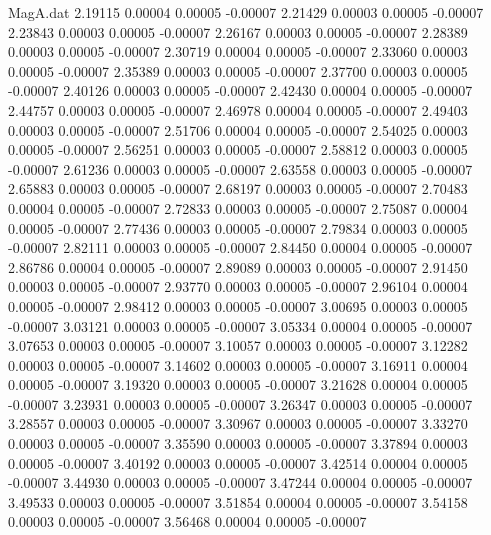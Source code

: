 \begin{filecontents}{MagA.dat}
   2.19115    0.00004    0.00005   -0.00007
   2.21429    0.00003    0.00005   -0.00007
   2.23843    0.00003    0.00005   -0.00007
   2.26167    0.00003    0.00005   -0.00007
   2.28389    0.00003    0.00005   -0.00007
   2.30719    0.00004    0.00005   -0.00007
   2.33060    0.00003    0.00005   -0.00007
   2.35389    0.00003    0.00005   -0.00007
   2.37700    0.00003    0.00005   -0.00007
   2.40126    0.00003    0.00005   -0.00007
   2.42430    0.00004    0.00005   -0.00007
   2.44757    0.00003    0.00005   -0.00007
   2.46978    0.00004    0.00005   -0.00007
   2.49403    0.00003    0.00005   -0.00007
   2.51706    0.00004    0.00005   -0.00007
   2.54025    0.00003    0.00005   -0.00007
   2.56251    0.00003    0.00005   -0.00007
   2.58812    0.00003    0.00005   -0.00007
   2.61236    0.00003    0.00005   -0.00007
   2.63558    0.00003    0.00005   -0.00007
   2.65883    0.00003    0.00005   -0.00007
   2.68197    0.00003    0.00005   -0.00007
   2.70483    0.00004    0.00005   -0.00007
   2.72833    0.00003    0.00005   -0.00007
   2.75087    0.00004    0.00005   -0.00007
   2.77436    0.00003    0.00005   -0.00007
   2.79834    0.00003    0.00005   -0.00007
   2.82111    0.00003    0.00005   -0.00007
   2.84450    0.00004    0.00005   -0.00007
   2.86786    0.00004    0.00005   -0.00007
   2.89089    0.00003    0.00005   -0.00007
   2.91450    0.00003    0.00005   -0.00007
   2.93770    0.00003    0.00005   -0.00007
   2.96104    0.00004    0.00005   -0.00007
   2.98412    0.00003    0.00005   -0.00007
   3.00695    0.00003    0.00005   -0.00007
   3.03121    0.00003    0.00005   -0.00007
   3.05334    0.00004    0.00005   -0.00007
   3.07653    0.00003    0.00005   -0.00007
   3.10057    0.00003    0.00005   -0.00007
   3.12282    0.00003    0.00005   -0.00007
   3.14602    0.00003    0.00005   -0.00007
   3.16911    0.00004    0.00005   -0.00007
   3.19320    0.00003    0.00005   -0.00007
   3.21628    0.00004    0.00005   -0.00007
   3.23931    0.00003    0.00005   -0.00007
   3.26347    0.00003    0.00005   -0.00007
   3.28557    0.00003    0.00005   -0.00007
   3.30967    0.00003    0.00005   -0.00007
   3.33270    0.00003    0.00005   -0.00007
   3.35590    0.00003    0.00005   -0.00007
   3.37894    0.00003    0.00005   -0.00007
   3.40192    0.00003    0.00005   -0.00007
   3.42514    0.00004    0.00005   -0.00007
   3.44930    0.00003    0.00005   -0.00007
   3.47244    0.00004    0.00005   -0.00007
   3.49533    0.00003    0.00005   -0.00007
   3.51854    0.00004    0.00005   -0.00007
   3.54158    0.00003    0.00005   -0.00007
   3.56468    0.00004    0.00005   -0.00007

\end{filecontents}
